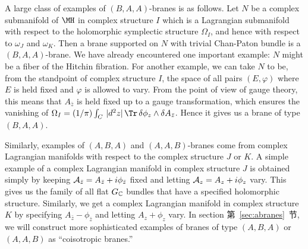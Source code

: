 A large class of examples  of $(B,A,A)$-branes is as follows. Let
$N$ be a complex submanifold of $\MH$ in complex structure $I$
which is a Lagrangian submanifold with respect to the holomorphic
symplectic structure $\Omega_I$, and hence with respect to
$\omega_J$ and $\omega_K$. Then  a brane supported on $N$ with
trivial Chan-Paton bundle is a $(B,A,A)$-brane. We have already
encountered one important example: $N$ might be a fiber of the
Hitchin fibration. For another example, we can take $N$ to be,
from the standpoint of complex structure $I$, the space of all
pairs $(E,\varphi)$  where $E$ is held fixed and $\varphi$ is
allowed to vary. {}From the point of view of gauge theory, this
means that $A_{\bar z}$ is held fixed up to a gauge
transformation, which ensures the vanishing of
$\Omega_I=(1/\pi)\int_C\,|d^2z|\,\Tr\,\delta
\phi_z\wedge\delta A_{\bar z}$.  Hence it gives us a brane of type
$(B,A,A)$.

Similarly, examples of $(A,B,A)$ and $(A,A,B)$-branes come from
complex Lagrangian manifolds with respect to the complex structure
$J$ or $K$. A simple example of a complex Lagrangian manifold in
complex structure $J$ is obtained simply by keeping ${\cal
A}_{\bar z}=A_{\bar z}+ i\phi_{\bar z}$ fixed and letting ${\cal
A}_z=A_z+i\phi_z$ vary. This gives us the family of all flat
$G_{{\Bbb{C}}}$ bundles that have a specified holomorphic
structure. Similarly, we get a complex Lagrangian manifold in
complex structure $K$ by specifying $A_{\bar z}-\phi_{\bar z}$ and
letting $A_z+\phi_z$ vary.  In section 第~\ref{sec:abranes}~节, we will construct
more sophisticated examples of branes of type $(A,B,A)$ or
$(A,A,B)$ as ``coisotropic branes.''

